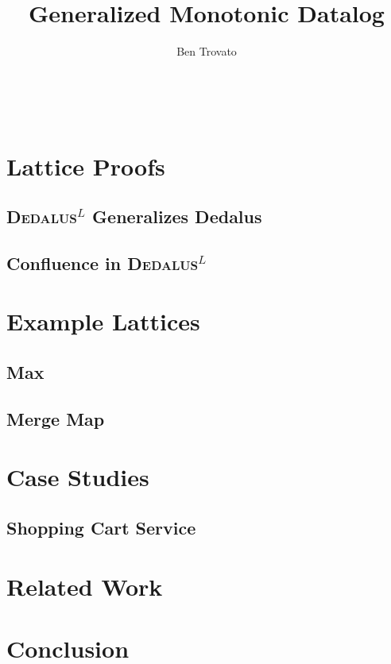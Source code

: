 \documentclass{vldb}
\def\latlang{\textsc{Dedalus}$^L$\xspace}
\begin{document}
\title{Generalized Monotonic Datalog}


\author{
\alignauthor
Ben Trovato\\
       \\
       \\
       \\
}

\maketitle

\begin{abstract}
\end{abstract}



\section{Lattice Proofs}

\subsection{\latlang Generalizes Dedalus}

\subsection{Confluence in \latlang}



\section{Example Lattices}

\subsection{Max}

\subsection{Merge Map}

\section{Case Studies}



\subsection{Shopping Cart Service}

\section{Related Work}

\section{Conclusion}



\end{document}
